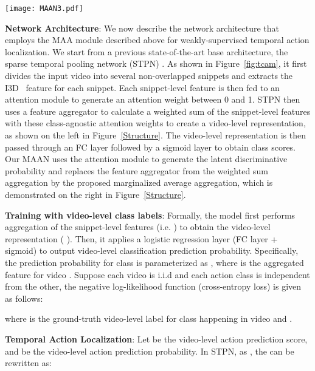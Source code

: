 \documentclass{article} \usepackage{iclr2019_conference,times}
\begin{document}
\begin{figure*}[t!]
\centering
\texttt{[image: MAAN3.pdf]}\vspace{-4mm}
\caption{The feature aggregators used in STPN and MAAN.}
\vspace{-2mm}
\label{Structure}
\end{figure*}
\vspace{-6mm}

\textbf{Network Architecture}: We now describe the network architecture that employs the MAA module described above for weakly-supervised temporal action localization. We start from a previous state-of-the-art base architecture, the sparse temporal pooling network (STPN) \citep{nguyen2017weakly}. As shown in Figure~\ref{fig:tcam}, it first divides the input video into several non-overlapped snippets and extracts the I3D~\citep{I3D} feature for each snippet. Each snippet-level feature is then fed to an attention module to generate an attention weight between 0 and 1. STPN then uses a feature aggregator to calculate a weighted sum of the snippet-level features with these class-agnostic attention weights to create a video-level representation, as shown on the left in Figure~\ref{Structure}. The video-level representation is then passed through an FC layer followed by a sigmoid layer to obtain class scores. Our MAAN uses the attention module to generate the latent discriminative probability  and replaces the feature aggregator from the weighted sum aggregation by the proposed marginalized average aggregation, which is demonstrated on the right in Figure~\ref{Structure}.


\textbf{Training with video-level class labels}: Formally, the model first performs aggregation of the snippet-level features (i.e.  ) to obtain the video-level representation  ( ). Then, it applies a logistic regression layer (FC layer + sigmoid) to output video-level classification prediction probability. Specifically, the prediction probability for class   is parameterized as  , where  is the aggregated feature for video . Suppose each video   is i.i.d and  each action class is independent from the other, the negative log-likelihood function (cross-entropy loss) is given as follows:

where  is the ground-truth video-level label for class  happening in video  and . 

\textbf{Temporal Action Localization}:
Let  be the video-level action prediction score, and  be the video-level action prediction probability. In STPN, as ,  the  can be rewritten as:
\end{document}
